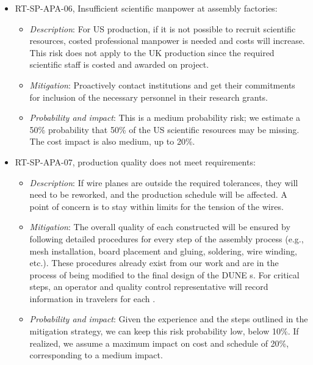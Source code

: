 \begin{itemize}
\item RT-SP-APA-06, Insufficient scientific manpower at  assembly factories:
\begin{itemize} %
\item \textit{Description}: %
For US production, if it is not possible to recruit scientific resources, costed professional manpower is needed and costs will increase. This risk does not apply to the UK production since the required scientific staff is costed and awarded on project.
\item \textit{Mitigation}: Proactively contact institutions and get their commitments for inclusion of the necessary personnel in their research grants.
\item \textit{Probability and impact}: This is a medium probability risk; we estimate a 50\% probability that 50\% of the US scientific resources may be missing. The cost impact is also medium, up to 20\%.
\end{itemize}

\item RT-SP-APA-07,  production quality does not meet requirements:
\begin{itemize} %
\item \textit{Description}: If wire planes are outside the required tolerances, they will need to be reworked, and the  production schedule will be affected. A point of concern is to stay within limits for the tension of the wires. 
\item \textit{Mitigation}: The overall quality of each constructed  will be ensured by following detailed procedures for every step of the assembly process (e.g., mesh installation, board placement and gluing, soldering, wire winding, etc.).  These procedures already exist from our  work and are in the process of being modified to the final design of the DUNE  s. For critical steps, an operator and quality control representative will record information in travelers for each . 
\item \textit{Probability and impact}: Given the  experience and the steps outlined in the mitigation strategy, we can keep this risk probability low, below 10\%. If realized, we assume a maximum impact on cost and schedule of 20\%, corresponding to a medium impact.
\end{itemize}


\end{itemize}
